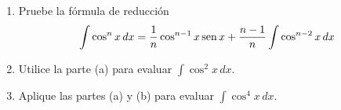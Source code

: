 \item 
    \begin{enumerate}
        \item[(a)] Pruebe la fórmula de reducción
        \[ \int \cos^n x \, dx = \frac{1}{n} \cos^{n-1} x \operatorname{sen} x + \frac{n - 1}{n} \int \cos^{n-2} x \, dx \]
        \item[(b)] Utilice la parte (a) para evaluar $\int \cos^2 x \, dx$.
        \item[(c)] Aplique las partes (a) y (b) para evaluar $\int \cos^4 x \, dx$.
    \end{enumerate}
